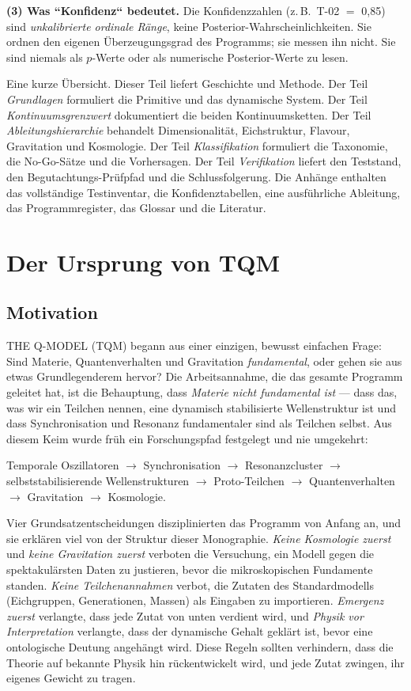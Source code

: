 \documentclass[10pt,twoside,openany]{book}
\begin{document}
\textbf{(3) Was ``Konfidenz`` bedeutet.} Die Konfidenzzahlen (z.\,B.\ T-02 $=$ 0{,}85) sind
\emph{unkalibrierte ordinale Ränge}, keine Posterior-Wahrscheinlichkeiten. Sie ordnen den
eigenen Überzeugungsgrad des Programms; sie messen ihn nicht. Sie sind niemals als
$p$-Werte oder als numerische Posterior-Werte zu lesen.

Eine kurze Übersicht. Dieser Teil liefert Geschichte und Methode. Der Teil
\emph{Grundlagen} formuliert die Primitive und das dynamische System. Der Teil
\emph{Kontinuumsgrenzwert} dokumentiert die beiden Kontinuumsketten. Der Teil
\emph{Ableitungshierarchie} behandelt Dimensionalität, Eichstruktur, Flavour, Gravitation
und Kosmologie. Der Teil \emph{Klassifikation} formuliert die Taxonomie, die No-Go-Sätze
und die Vorhersagen. Der Teil \emph{Verifikation} liefert den Teststand, den
Begutachtungs-Prüfpfad und die Schlussfolgerung. Die Anhänge enthalten das vollständige
Testinventar, die Konfidenztabellen, eine ausführliche Ableitung, das Programmregister,
das Glossar und die Literatur.

\chapter{Der Ursprung von TQM}
\label{ch:origin}

\section{Motivation}

THE Q-MODEL (TQM) begann aus einer einzigen, bewusst einfachen Frage: Sind Materie,
Quantenverhalten und Gravitation \emph{fundamental}, oder gehen sie aus etwas
Grundlegenderem hervor? Die Arbeitsannahme, die das gesamte Programm geleitet hat, ist die
Behauptung, dass \emph{Materie nicht fundamental ist} --- dass das, was wir ein Teilchen
nennen, eine dynamisch stabilisierte Wellenstruktur ist und dass Synchronisation und
Resonanz fundamentaler sind als Teilchen selbst. Aus diesem Keim wurde früh ein
Forschungspfad festgelegt und nie umgekehrt:

\begin{center}
Temporale Oszillatoren $\to$ Synchronisation $\to$ Resonanzcluster $\to$
selbststabilisierende Wellenstrukturen $\to$ Proto-Teilchen $\to$ Quantenverhalten $\to$
Gravitation $\to$ Kosmologie.
\end{center}

Vier Grundsatzentscheidungen disziplinierten das Programm von Anfang an, und sie erklären
viel von der Struktur dieser Monographie. \emph{Keine Kosmologie zuerst} und \emph{keine
Gravitation zuerst} verboten die Versuchung, ein Modell gegen die spektakulärsten Daten zu
justieren, bevor die mikroskopischen Fundamente standen. \emph{Keine
Teilchenannahmen} verbot, die Zutaten des Standardmodells (Eichgruppen, Generationen,
Massen) als Eingaben zu importieren. \emph{Emergenz zuerst} verlangte, dass jede Zutat von
unten verdient wird, und \emph{Physik vor Interpretation} verlangte, dass der dynamische
Gehalt geklärt ist, bevor eine ontologische Deutung angehängt wird. Diese Regeln sollten
verhindern, dass die Theorie auf bekannte Physik hin rückentwickelt wird, und jede Zutat
zwingen, ihr eigenes Gewicht zu tragen.
\end{document}
